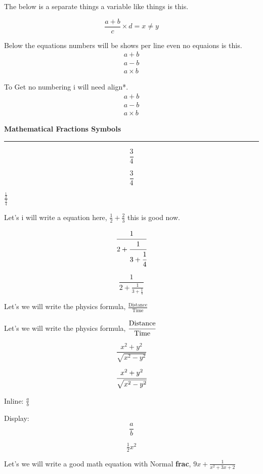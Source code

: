 \documentclass[12pt, letterpaper]{article}
\begin{document}
The below is a separate things a variable like things is this.

$$
\frac{a+b}{c} \times d = x \neq y
$$




Below the equations numbers will be shows per line even no equaions is this.
\begin{align}
    a + b \\
    a - b \\
    a \times b
\end{align}



To Get no numbering i will need align*.
\begin{align*}
    a + b \\
    a - b \\
    a \times b
\end{align*}








\newpage

\begin{center}
    \Huge\textbf{Mathematical Fractions Symbols}
\end{center}

\noindent\rule{\linewidth}{5pt}

\[
\frac{3}{4}
\]

$$
\frac{3}{4}
$$

$\frac{\frac{1}{2}}{\frac{3}{4}}$

Let's i will write a equation here, $\tfrac{1}{2} + \tfrac{2}{3}$ this is good now.


\[
\cfrac{1}{2 + \cfrac{1}{3 + \cfrac{1}{4}}}
\]


\[
\frac{1}{2 + \frac{1}{3 + \frac{1}{4}}}
\]

Let's we will write the physics formula, $\frac{\text{Distance}}{\text{Time}}$

Let's we will write the physics formula, $\cfrac{\text{Distance}}{\text{Time}}$

\[
\frac{x^2 + y^2}{\sqrt{x^2 - y^2}}
\]

\[
\cfrac{x^2 + y^2}{\sqrt{x^2 - y^2}}
\]


\newpage

Inline: $\frac{a}{b}$

Display:
\[
\frac{a}{b}
\]


\[
\tfrac{1}{2}x^2
\]

Let's we will write a good math equation with Normal \textbf{frac}, $9x + \frac{1}{x^2+3x + 2}$
\end{document}
